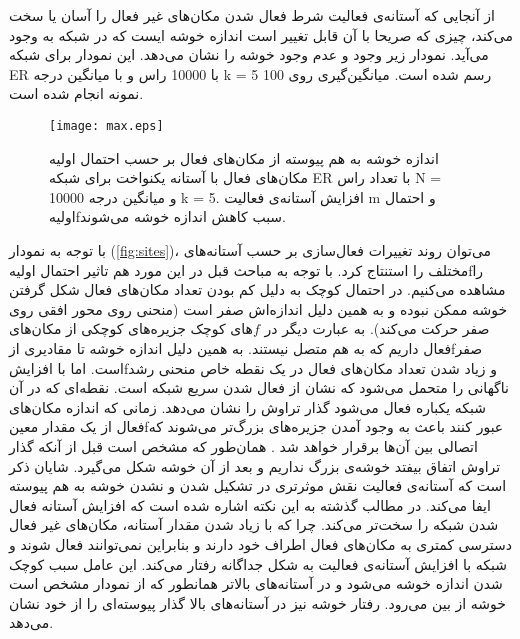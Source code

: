 از آنجایی که آستانه‌ی فعالیت شرط فعال شدن مکان‌‌های غیر فعال  را آسان یا سخت می‌کند، چیزی که صریحا با آن قابل تغییر است اندازه خوشه ایست که در شبکه به وجود می‌آید. نمودار زیر وجود و عدم وجود خوشه را نشان می‌دهد. این نمودار برای شبکه ER با 10000 راس و با میانگین درجه \lqngle k \rangle = 5 رسم شده است.  میانگین‌گیری روی 100 نمونه انجام شده است.
\begin{figure} [htbp]
\centering
\texttt{[image: max.eps]} 
\caption [اندازه خوشه به هم پیوسته از مکان‌های فعال بر حسب احتمال اولیه مکان‌های فعال با آستانه یکنواخت  شبکه ER]{\footnotesize اندازه خوشه به هم پیوسته از مکان‌های فعال بر حسب احتمال  اولیه مکان‌های فعال با آستانه یکنواخت برای شبکه ER با تعداد راس N = 10000 و میانگین درجه \lqngle k \rangle = 5. افزایش آستانه‌ی فعالیت m و  احتمال اولیهfسبب کاهش اندازه خوشه می‌شوند.}
\label{fig:max}
\end{figure}

با توجه به نمودار (\ref{fig:sites})، می‌توان ‌روند تغییرات فعال‌سازی بر حسب آستانه‌های مختلف را استنتاج کرد. با توجه به مباحث قبل در این مورد هم تاثیر احتمال اولیهfرا مشاهده می‌کنیم. در احتمال کوچک به دلیل کم بودن تعداد مکان‌های فعال شکل گرفتن خوشه ممکن نبوده و به همین دلیل اندازه‌اش صفر است (منحنی روی محور افقی  روی صفر حرکت می‌کند). به عبارت دیگر در $f$های کوچک جزیره‌‌های کوچکی از مکان‌های فعال داریم که به هم متصل نیستند. به همین دلیل اندازه خوشه تا مقادیری ازfصفر است. اما با افزایشfو زیاد شدن تعداد مکان‌های فعال در یک نقطه خاص  منحنی رشد ناگهانی را متحمل می‌شود که نشان از فعال شدن سریع شبکه  است. نقطه‌ای که در آن شبکه یکباره فعال می‌شود گذار تراوش را نشان می‌دهد. زمانی که اندازه مکان‌های فعال از یک مقدار معینfعبور کنند  باعث به وجود آمدن جزیره‌های بزرگ‌تر می‌شوند که  اتصالی بین آن‌ها برقرار خواهد شد . همان‌طور که مشخص است قبل از  آنکه گذار تراوش  اتفاق بیفتد  خوشه‌ی  بزرگ نداریم و بعد از آن خوشه شکل می‌گیرد. شایان ذکر است که آستانه‌ی فعالیت نقش موثرتری در تشکیل شدن و نشدن خوشه به هم پیوسته ایفا می‌کند. در مطالب گذشته به این نکته اشاره شده است که افزایش آستانه فعال شدن شبکه را سخت‌تر می‌کند. چرا که با زیاد شدن مقدار آستانه، مکان‌های غیر فعال دسترسی کمتری به مکان‌های فعال اطراف خود دارند و بنابراین نمی‌توانند فعال شوند و شبکه با افزایش آستانه‌ی فعالیت به شکل جداگانه رفتار می‌کند. این عامل سبب کوچک شدن اندازه خوشه می‌شود و در آستانه‌های بالاتر همانطور که از نمودار مشخص است خوشه از بین می‌رود. رفتار خوشه نیز در آستانه‌های بالا گذار پیوسته‌ای را از خود نشان می‌دهد.


